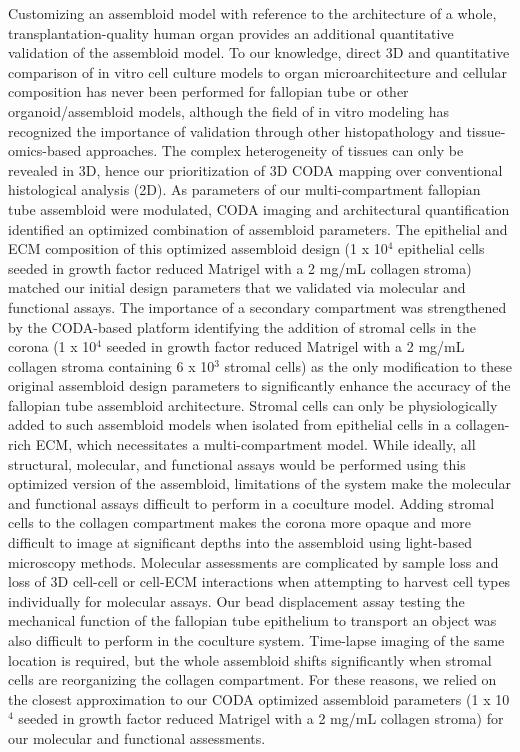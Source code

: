 \begin{refsection}
    Customizing an assembloid model with reference to the architecture of a whole, transplantation-quality human organ provides an additional quantitative validation of the assembloid model. To our knowledge, direct 3D and quantitative comparison of in vitro cell culture models to organ microarchitecture and cellular composition has never been performed for fallopian tube or other organoid/assembloid models, although the field of in vitro modeling has recognized the importance of validation through other histopathology and tissue-omics-based approaches\cite{garcia-alonso2021a,camp2018a,zhao2022a}. The complex heterogeneity of tissues can only be revealed in 3D\cite{kiemen2022a,Forjaz2025Three}, hence our prioritization of 3D CODA mapping over conventional histological analysis (2D).
    As parameters of our multi-compartment fallopian tube assembloid were modulated, CODA imaging and architectural quantification identified an optimized combination of assembloid parameters. The epithelial and ECM composition of this optimized assembloid design (1 x 10$^4$ epithelial cells seeded in growth factor reduced Matrigel with a 2 mg/mL collagen stroma) matched our initial design parameters that we validated via molecular and functional assays. The importance of a secondary compartment was strengthened by the CODA-based platform identifying the addition of stromal cells in the corona (1 x 10$^4$ seeded in growth factor reduced Matrigel with a 2 mg/mL collagen stroma containing 6 x 10$^3$ stromal cells) as the only modification to these original assembloid design parameters to significantly enhance the accuracy of the fallopian tube assembloid architecture. Stromal cells can only be physiologically added to such assembloid models when isolated from epithelial cells in a collagen-rich ECM, which necessitates a multi-compartment model. While ideally, all structural, molecular, and functional assays would be performed using this optimized version of the assembloid, limitations of the system make the molecular and functional assays difficult to perform in a coculture model. Adding stromal cells to the collagen compartment makes the corona more opaque and more difficult to image at significant depths into the assembloid using light-based microscopy methods. Molecular assessments are complicated by sample loss and loss of 3D cell-cell or cell-ECM interactions when attempting to harvest cell types individually for molecular assays. Our bead displacement assay testing the mechanical function of the fallopian tube epithelium to transport an object was also difficult to perform in the coculture system. Time-lapse imaging of the same location is required, but the whole assembloid shifts significantly when stromal cells are reorganizing the collagen compartment. For these reasons, we relied on the closest approximation to our CODA optimized assembloid parameters (1 x 10$^4$ seeded in growth factor reduced Matrigel with a 2 mg/mL collagen stroma) for our molecular and functional assessments.

\end{refsection}
